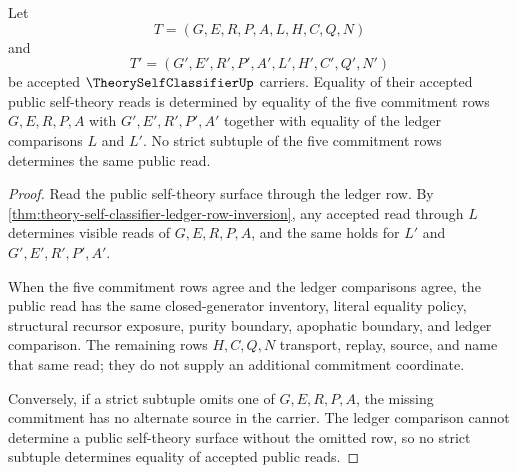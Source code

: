 \begin{theorem}
\label{thm:theory-self-classifier-five-row-determinacy}
Let
$$
T=(G,E,R,P,A,L,H,C,Q,N)
$$
and
$$
T'=(G',E',R',P',A',L',H',C',Q',N')
$$
be accepted $\TheorySelfClassifierUp$ carriers. Equality of their accepted public self-theory reads is determined by equality of the five commitment rows $G,E,R,P,A$ with $G',E',R',P',A'$ together with equality of the ledger comparisons $L$ and $L'$. No strict subtuple of the five commitment rows determines the same public read.
\end{theorem}
\begin{proof}
Read the public self-theory surface through the ledger row. By \autoref{thm:theory-self-classifier-ledger-row-inversion}, any accepted read through $L$ determines visible reads of $G,E,R,P,A$, and the same holds for $L'$ and $G',E',R',P',A'$.

When the five commitment rows agree and the ledger comparisons agree, the public read has the same closed-generator inventory, literal equality policy, structural recursor exposure, purity boundary, apophatic boundary, and ledger comparison. The remaining rows $H,C,Q,N$ transport, replay, source, and name that same read; they do not supply an additional commitment coordinate.

Conversely, if a strict subtuple omits one of $G,E,R,P,A$, the missing commitment has no alternate source in the carrier. The ledger comparison cannot determine a public self-theory surface without the omitted row, so no strict subtuple determines equality of accepted public reads.
\end{proof}

